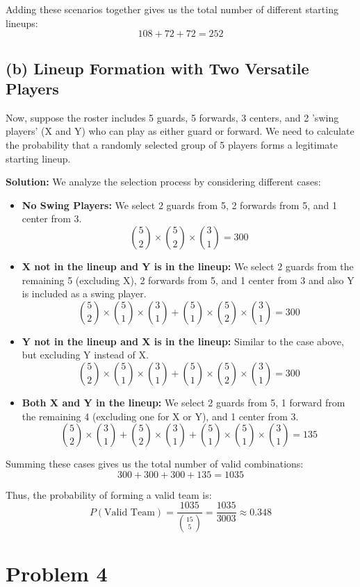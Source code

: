 \documentclass{article}
\begin{document}
Adding these scenarios together gives us the total number of different starting lineups:
\[
108 + 72 + 72 = 252
\]

\subsection*{(b) Lineup Formation with Two Versatile Players}
Now, suppose the roster includes 5 guards, 5 forwards, 3 centers, and 2 'swing players' (X and Y) who can play as either guard or forward. We need to calculate the probability that a randomly selected group of 5 players forms a legitimate starting lineup.

\textbf{Solution:}
We analyze the selection process by considering different cases:
\begin{itemize}
    \item \textbf{No Swing Players:} We select 2 guards from 5, 2 forwards from 5, and 1 center from 3.
    \[
    \binom{5}{2} \times \binom{5}{2} \times \binom{3}{1} = 300
    \]
    \item \textbf{X not in the lineup and Y is in the lineup:} We select 2 guards from the remaining 5 (excluding X), 2 forwards from 5, and 1 center from 3 and also Y is included as a swing player.
    \[
    \binom{5}{2} \times \binom{5}{1} \times \binom{3}{1} + \binom{5}{1} \times \binom{5}{2} \times \binom{3}{1} = 300
    \]
    \item \textbf{Y not in the lineup and X is in the lineup:} Similar to the case above, but excluding Y instead of X.
    \[
    \binom{5}{2} \times \binom{5}{1} \times \binom{3}{1} + \binom{5}{1} \times \binom{5}{2} \times \binom{3}{1} = 300
    \]
    \item \textbf{Both X and Y in the lineup:} We select 2 guards from 5, 1 forward from the remaining 4 (excluding one for X or Y), and 1 center from 3.
    \[
    \binom{5}{2} \times \binom{3}{1} + \binom{5}{2} \times \binom{3}{1} + \binom{5}{1} \times \binom{5}{1} \times \binom{3}{1} = 135
    \]
\end{itemize}

Summing these cases gives us the total number of valid combinations:
\[
300 + 300 + 300 + 135 = 1035
\]

Thus, the probability of forming a valid team is:
\[
P(\text{Valid Team}) = \frac{1035}{\binom{15}{5}} = \frac{1035}{3003} \approx 0.348
\]
\section*{Problem 4}
\end{document}
